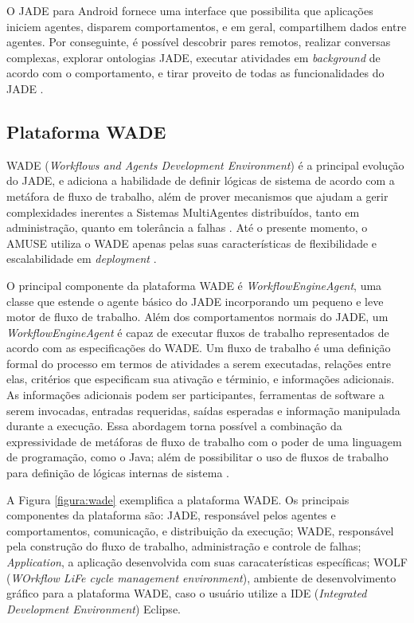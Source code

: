 O JADE para Android fornece uma interface que possibilita que aplicações iniciem agentes, disparem comportamentos, e em geral, compartilhem dados entre agentes. Por conseguinte, é possível descobrir pares remotos, realizar conversas complexas, explorar ontologias JADE, executar atividades em \textit{background} de acordo com o comportamento, e tirar proveito de todas as funcionalidades do JADE \cite{bergenti2014}.

    \subsection{Plataforma WADE}

WADE (\textit{Workflows and Agents Development Environment}) é a principal
evolução do JADE, e adiciona a habilidade de definir lógicas de sistema de
acordo com a metáfora de fluxo de trabalho, além de prover mecanismos que ajudam
a gerir complexidades inerentes a Sistemas MultiAgentes distribuídos, tanto em
administração, quanto em tolerância a falhas \cite{wade2009}.
Até o presente momento, o AMUSE utiliza o WADE apenas pelas suas características
de flexibilidade e escalabilidade em \textit{deployment} \cite{bergenti2015}.

O principal componente da plataforma WADE é \textit{WorkflowEngineAgent}, uma
classe que estende o agente básico do JADE incorporando um pequeno e leve motor
de fluxo de trabalho. Além dos comportamentos normais do JADE, um
\textit{WorkflowEngineAgent} é capaz de executar fluxos de trabalho
representados de acordo com as especificações do WADE. Um fluxo de trabalho é
uma definição formal do processo em termos de atividades a serem executadas,
relações entre elas, critérios que especificam sua ativação e términio, e
informações adicionais. As informações adicionais podem ser participantes,
ferramentas de software a serem invocadas, entradas requeridas, saídas esperadas
e informação manipulada durante a execução. Essa abordagem torna possível a
combinação da expressividade de metáforas de fluxo de trabalho com o poder de
uma linguagem de programação, como o Java; além de possibilitar o uso de fluxos
de trabalho para definição de lógicas internas de sistema \cite{wade}.

A Figura \ref{figura:wade} exemplifica a plataforma WADE. Os principais
componentes da plataforma são: JADE, responsável pelos agentes e comportamentos,
comunicação, e distribuição da execução; WADE, responsável pela construção do
fluxo de trabalho, administração e controle de falhas; \textit{Application}, a
aplicação desenvolvida com suas caracaterísticas específicas; WOLF
(\textit{WOrkflow LiFe cycle management environment}), ambiente de
desenvolvimento gráfico para a plataforma WADE, caso o usuário utilize a IDE
(\textit{Integrated Development Environment}) Eclipse.

